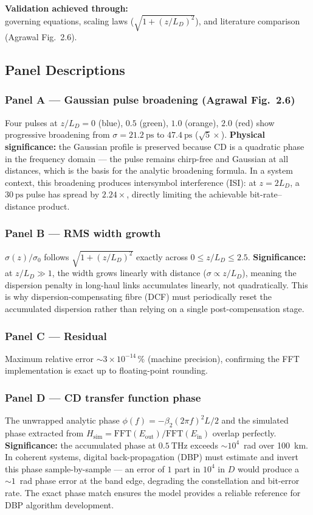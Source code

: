 ﻿\documentclass[11pt,a4paper]{article}
\begin{document}
\medskip
\noindent\textbf{Validation achieved through:}\\
governing equations, scaling laws ($\sqrt{1+(z/L_D)^2}$), and literature
comparison (Agrawal Fig.~2.6).

\subsection{Panel Descriptions}

\subsubsection*{Panel A --- Gaussian pulse broadening (Agrawal Fig.~2.6)}
Four pulses at $z/L_D = 0$ (blue), $0.5$ (green), $1.0$ (orange),
$2.0$ (red) show progressive broadening from $\sigma = \SI{21.2}{\ps}$ to
$\SI{47.4}{\ps}$ ($\sqrt{5}\times$).  \textbf{Physical significance:} the
Gaussian profile is preserved because CD is a quadratic phase in the
frequency domain --- the pulse remains chirp-free and Gaussian at all
distances, which is the basis for the analytic broadening formula.  In a
system context, this broadening produces intersymbol interference (ISI):
at $z = 2L_D$, a $\SI{30}{\ps}$ pulse has spread by $2.24\times$,
directly limiting the achievable bit-rate--distance product.

\subsubsection*{Panel B --- RMS width growth}
$\sigma(z)/\sigma_0$ follows $\sqrt{1 + (z/L_D)^2}$ exactly across
$0 \le z/L_D \le 2.5$.  \textbf{Significance:} at $z/L_D \gg 1$, the width
grows linearly with distance ($\sigma \propto z/L_D$), meaning the
dispersion penalty in long-haul links accumulates linearly, not
quadratically.  This is why dispersion-compensating fibre (DCF) must
periodically reset the accumulated dispersion rather than relying on a
single post-compensation stage.

\subsubsection*{Panel C --- Residual}
Maximum relative error $\sim\!3\times10^{-14}\,\%$ (machine precision),
confirming the FFT implementation is exact up to floating-point rounding.

\subsubsection*{Panel D --- CD transfer function phase}
The unwrapped analytic phase $\phi(f) = -\beta_2(2\pi f)^2 L/2$ and the
simulated phase extracted from $H_\text{sim} =
\text{FFT}(E_\text{out})/\text{FFT}(E_\text{in})$ overlap perfectly.
\textbf{Significance:} the accumulated phase at
$\SI{0.5}{\THz}$ exceeds $\sim\!10^4$~rad over 100~km.  In coherent
systems, digital back-propagation (DBP) must estimate and invert this
phase sample-by-sample --- an error of $1$ part in $10^4$ in $D$ would
produce a $\sim\!1$~rad phase error at the band edge, degrading the
constellation and bit-error rate.  The exact phase match ensures the model
provides a reliable reference for DBP algorithm development.
\end{document}
